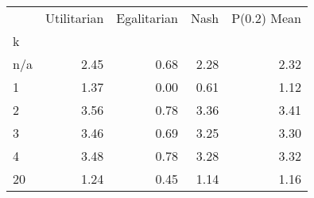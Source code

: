 \begin{tabular}{lrrrr}
\toprule
 & Utilitarian & Egalitarian & Nash & P(0.2) Mean \\
k &  &  &  &  \\
\midrule
n/a & 2.45 & 0.68 & 2.28 & 2.32 \\
1 & 1.37 & 0.00 & 0.61 & 1.12 \\
2 & 3.56 & 0.78 & 3.36 & 3.41 \\
3 & 3.46 & 0.69 & 3.25 & 3.30 \\
4 & 3.48 & 0.78 & 3.28 & 3.32 \\
20 & 1.24 & 0.45 & 1.14 & 1.16 \\
\bottomrule
\end{tabular}
